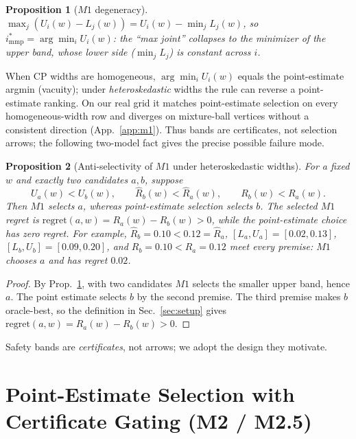 \documentclass{article}
\newtheorem{proposition}{Proposition}
\begin{document}
\begin{proposition}[$M1$ degeneracy]
\label{prop:m1}
$\max_j (U_i(w)-L_j(w)) = U_i(w)-\min_j L_j(w)$, so
$i^*_{\mathrm{mmp}}=\arg\min_i U_i(w)$: the ``max joint'' collapses to the minimizer of the
upper band, whose lower side ($\min_j L_j$) is constant across $i$.
\end{proposition}

When CP widths are homogeneous, $\arg\min_i U_i(w)$ equals the point-estimate argmin
(vacuity); under \emph{heteroskedastic} widths the rule can reverse a point-estimate ranking.
On our real grid it matches point-estimate selection on every homogeneous-width row and diverges
on mixture-ball vertices without a consistent direction (App.~\ref{app:m1}). Thus bands are
certificates, not selection arrows; the following two-model fact gives the precise possible
failure mode.

\begin{proposition}[Anti-selectivity of $M1$ under heteroskedastic widths]
\label{prop:m1anti}
For a fixed $w$ and exactly two candidates $a,b$, suppose
\[
 U_a(w)<U_b(w),\qquad \hat R_b(w)<\hat R_a(w),\qquad R_b(w)<R_a(w).
\]
Then $M1$ selects $a$, whereas point-estimate selection selects $b$. The selected $M1$
regret is $\mathrm{regret}(a,w)=R_a(w)-R_b(w)>0$, while the point-estimate choice has zero
regret. For example, $\hat R_b=0.10<0.12=\hat R_a$,
$[L_a,U_a]=[0.02,0.13]$, $[L_b,U_b]=[0.09,0.20]$, and
$R_b=0.10<R_a=0.12$ meet every premise: $M1$ chooses $a$ and has regret $0.02$.
\end{proposition}
\begin{proof}
By Prop.~\ref{prop:m1}, with two candidates $M1$ selects the smaller upper band, hence $a$.
The point estimate selects $b$ by the second premise. The third premise makes $b$ oracle-best,
so the definition in Sec.~\ref{sec:setup} gives $\mathrm{regret}(a,w)=R_a(w)-R_b(w)>0$.
\end{proof}

Safety bands are \emph{certificates}, not arrows; we adopt the design they motivate.

\section{Point-Estimate Selection with Certificate Gating (M2 / M2.5)}
\label{sec:m2}
\suppressfloats[t]
\end{document}
